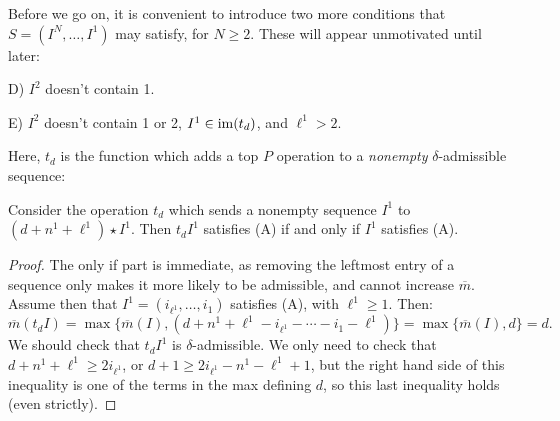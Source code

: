 \documentclass[10pt]{article}
\newcommand{\minDimP}{\overline{m}}
\begin{document}
\begin{SequenceOfSequencesIntro}
Before we go on, it is convenient to introduce two more conditions that $S=(I^N,\ldots,I^1)$ may satisfy, for $N\geq2$. These will appear unmotivated until later:
\begin{itemise}
\setlength{\parindent}{.25in}
\item[D)] $I^2$ doesn't contain 1.
\item[E)] $I^2$ doesn't contain 1 or 2, $I^1\in\operatorname{im}(t_d)$, and $\ell^1>2$.
\end{itemise}
Here, $t_d$ is the function which adds a top $P$ operation to a \emph{nonempty} $\delta$-admissible sequence:
\begin{lem}
Consider the operation $t_d$ which sends a nonempty sequence  $I^1$ to $(d+n^1+\ell^1)\star I^1$. Then $t_dI^1$ satisfies \textup{(A)} if and only if $I^1$ satisfies \textup{(A)}.
\end{lem}
\begin{proof}
The only if part is immediate, as removing the leftmost entry of a sequence only makes it more likely to be admissible, and cannot increase $\minDimP$. Assume then that $I^1=(i_{\ell^1},\ldots,i_1)$ satisfies \textup{(A)}, with $\ell^1\geq1$. Then:%
\[\minDimP(t_dI)=\max\{\minDimP(I),(d+n^1+\ell^1-i_{\ell^1}-\cdots -i_1-\ell^1)\}=\max\{\minDimP(I),d\}=d.\]
We should check that $t_dI^1$ is $\delta$-admissible. We only need to check that $d+n^1+\ell^1\geq2i_{\ell^1}$, or $d+1\geq2i_{\ell^1}-n^1-\ell^1+1$, but the right hand side of this inequality is one of the terms in the max defining $d$, so this last inequality holds (even strictly).
\end{proof}
\end{SequenceOfSequencesIntro}
\end{document}
